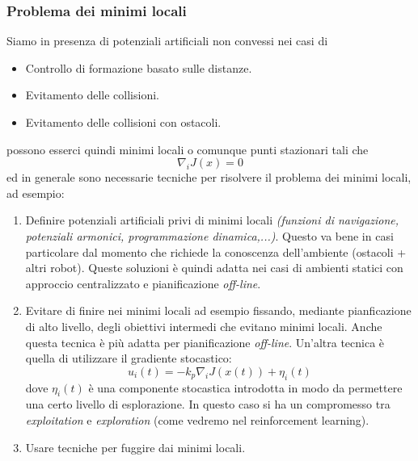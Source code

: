 \subsubsection{Problema dei minimi locali}
Siamo in presenza di potenziali artificiali non convessi nei casi di
\begin{itemize}
\item Controllo di formazione basato sulle distanze.
\item Evitamento delle collisioni.
\item Evitamento delle collisioni con ostacoli.
\end{itemize}
possono esserci quindi minimi locali o comunque punti stazionari tali che
\begin{equation}
\nabla_i J(x) = 0
\end{equation} ed in generale sono necessarie tecniche per risolvere il problema dei minimi locali, ad esempio:
\begin{enumerate}
\item Definire potenziali artificiali privi di minimi locali \textit{(funzioni di navigazione, potenziali armonici, programmazione dinamica,...)}. Questo va bene in casi particolare dal momento che richiede la conoscenza dell'ambiente (ostacoli + altri robot). Queste soluzioni \`e quindi adatta nei casi di ambienti statici con approccio centralizzato e pianificazione \textit{off-line}.
\item Evitare di finire nei minimi locali ad esempio fissando, mediante pianficazione di alto livello, degli obiettivi intermedi che evitano minimi locali. Anche questa tecnica \`e pi\`u adatta per pianificazione \textit{off-line}. Un'altra tecnica \`e quella di utilizzare il gradiente stocastico:
   \begin{equation}
    u_i(t) = -k_p \nabla_i J(x(t)) + \eta_i(t) 
   \end{equation} dove $\eta_i(t)$ \`e una componente stocastica introdotta in modo da permettere una certo livello di esplorazione. In questo caso si ha un compromesso tra \textit{exploitation} e \textit{exploration} (come vedremo nel reinforcement learning).
\item Usare tecniche per fuggire dai minimi locali.
\end{enumerate}


